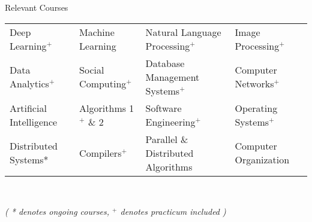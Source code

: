 \documentclass{resume} %
\begin{document}
\begin{rSection}{Relevant Courses}
\begin{tabular}{p{3.7cm} p{3.5cm} p{5.7cm} p{4.1cm}}
Deep Learning$^+$ & Machine Learning & Natural Language Processing$^+$ & Image Processing$^+$ \\
Data Analytics$^+$ & Social Computing$^+$ & Database Management Systems$^+$ & Computer Networks$^+$  \\
Artificial Intelligence & Algorithms 1$^+$ \& 2 & Software Engineering$^+$ & Operating Systems$^+$ \\
Distributed Systems* & Compilers$^+$ & Parallel \& Distributed Algorithms & Computer Organization\\
\end{tabular}\\
\centerline{\footnotesize \textit{ ( * denotes ongoing courses, $^+$ denotes practicum included )  }}
\end{rSection}

\end{document}
